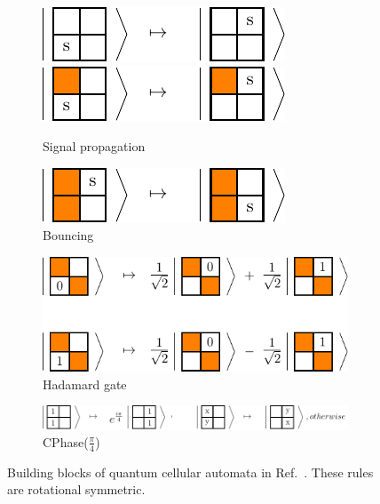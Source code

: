\documentclass[a4paper]{article}
\newcommand{\<}{\langle}
\renewcommand{\>}{\rangle}
\begin{document}
\begin{figure}[th]
  \begin{subfigure}[b]{\textwidth}
  \centering
  \includegraphics[scale=1]{images/bqca-signal.pdf} ~~~~~~~~
  \includegraphics[scale=1]{images/bqca-signal1.pdf}
  \caption{Signal propagation}
  \end{subfigure}

  \hfill
  
  \begin{subfigure}[b]{\textwidth}
  \centering
  \includegraphics[scale=1]{images/bqca-bouncing.pdf}
  \caption{Bouncing}
  \end{subfigure}

  \hfill

  \centering
  \begin{subfigure}[b]{\textwidth}
  \centering
  \includegraphics[scale=1]{images/bqca-hadamard.pdf}
  \caption{Hadamard gate}
  \end{subfigure}
  
  \hfill
  
  \begin{subfigure}[b]{\textwidth}
  \centering
  \includegraphics[scale=1]{images/bqca-cphase.pdf}
  \caption{CPhase($\frac{\pi}{4}$)}
  \end{subfigure}
  \caption{Building blocks of quantum cellular automata in Ref.~\cite{Arrighi2012}. These rules are rotational symmetric.}
  \label{fig:qbca}
\end{figure}
\end{document}
